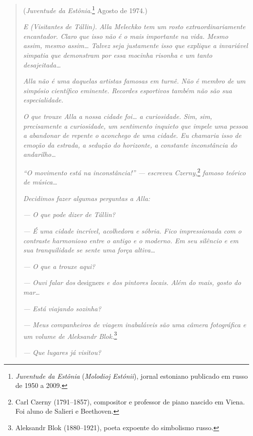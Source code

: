 \begin{quotation}
\begin{flushright}
(\emph{Juventude da Estônia}.\footnote{\emph{Juventude da Estônia}
  (\emph{Molodioj Estónii}), jornal estoniano publicado em russo de 1950
  a 2009.} Agosto de 1974.)
\end{flushright}
\vspace{4pt}
\noindent\emph{E (Visitantes de Tállin). Alla Melechko tem um
rosto extraordinariamente encantador. Claro que isso não é o mais
importante na vida. Mesmo assim, mesmo assim\ldots{} Talvez seja justamente
isso que explique a invariável simpatia que demonstram por essa mocinha
risonha e um tanto desajeitada\ldots{}}

\emph{Alla não é uma daquelas artistas famosas em turnê. Não é membro de
um simpósio científico eminente. Recordes esportivos também não são sua
especialidade.}

\emph{O que trouxe Alla a nossa cidade foi\ldots{} a curiosidade. Sim, sim,
precisamente a curiosidade, um sentimento inquieto que impele uma pessoa
a abandonar de repente o aconchego de uma cidade. Eu chamaria isso de
emoção da estrada, a sedução do horizonte, a constante inconstância do
andarilho\ldots{}}

\emph{``O movimento está na inconstância!'' --- escreveu
Czerny,}\footnote{Carl Czerny (1791--1857), compositor e professor de
  piano nascido em Viena. Foi aluno de Salieri e Beethoven.}
\emph{famoso teórico de música\ldots{}}

\emph{Decidimos fazer algumas perguntas a Alla:}

\emph{--- O que pode dizer de Tállin?}

\emph{--- É uma cidade incrível, acolhedora e sóbria. Fico impressionada
com o contraste harmonioso entre o antigo e o moderno. Em seu silêncio e
em sua tranquilidade se sente uma força altiva\ldots{}}

\emph{--- O que a trouxe aqui?}

\emph{--- Ouvi falar dos} designers \emph{e dos pintores locais. Além do
mais, gosto do mar\ldots{}}

\emph{--- Está viajando sozinha?}

\emph{--- Meus companheiros de viagem inabaláveis são uma câmera
fotográfica e um volume de Aleksandr Blok.}\footnote{Aleksandr Blok
  (1880--1921), poeta expoente do simbolismo russo.}

\emph{--- Que lugares já visitou?}


\end{quotation}
